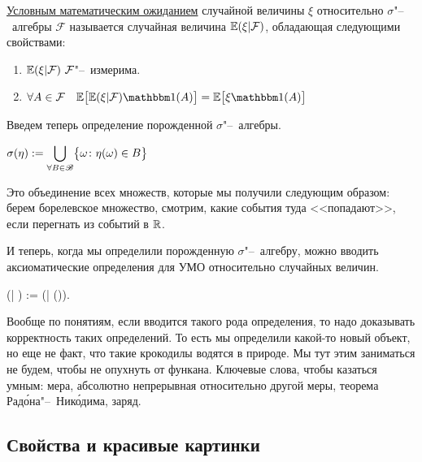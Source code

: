 \documentclass[../TV&MS.tex]{subfiles}
\begin{document}
\begin{Def}
    \uline{Условным математическим ожиданием} случайной величины $\xi$ 
    относительно $\sigma$"--~алгебры $\mathcal{F}$ называется случайная
    величина $\mathbb{E}(\xi | \mathcal{F})$, обладающая следующими свойствами:
    \begin{enumerate}
        \item $\Expec(\xi | \mathcal{F})\ \mathcal{F}$"--~измерима.
        \item $\forall A \in \mathcal{F} \quad 
            \Expec\bigl[ \Expec(\xi | \mathcal{F}) \Ind(A) \bigr] =
            \Expec \bigl[ \xi \Ind(A) \bigr]$
    \end{enumerate} 
\end{Def}

Введем теперь определение порожденной $\sigma$"--~алгебры.

\begin{Def}
    $\displaystyle \sigma(\eta) := 
    \bigcup\limits_{\forall B \in \mathscr{B}} \bigl\{\omega \colon \eta(\omega) \in B\bigr\}$
\end{Def} 

\begin{Wtf}
    Это объединение всех множеств, которые мы получили следующим образом:
    берем борелевское множество, смотрим, какие события туда <<попадают>>,
    если перегнать из событий в $\mathbb{R}$.
\end{Wtf} 

И теперь, когда мы определили порожденную $\sigma$"--~алгебру,
можно вводить аксиоматические определения для УМО относительно случайных величин.

\begin{Def}
    \Expec(\xi | \eta) := \Expec(\xi | \sigma(\eta)).
\end{Def} 

Вообще по понятиям, если вводится такого рода определения, то надо доказывать корректность таких определений.
То есть мы определили какой-то новый объект, но еще не факт, что такие крокодилы водятся в природе.
Мы тут этим заниматься не будем, чтобы не опухнуть от функана.
Ключевые слова, чтобы казаться умным: мера, абсолютно непрерывная относительно другой меры, теорема Рад\'{о}на"--~Ник\'{о}дима, заряд.

\subsection{Свойства и красивые картинки}
\end{document}
